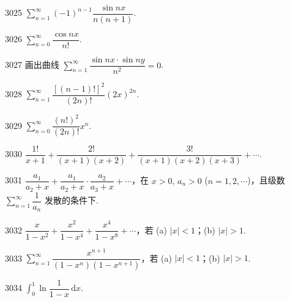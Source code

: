 \begin{prob}[S]{3025}
$\sum\limits_{n=1}^{\infty} (-1)^{n-1} \dfrac{\sin nx}{n(n+1)}$.
\end{prob}

\begin{prob}[S]{3026}
$\sum\limits_{n=0}^{\infty} \dfrac{\cos nx}{n!}$.
\end{prob}

\begin{prob}[M]{3027}
画出曲线 $\sum\limits_{n=1}^{\infty} \dfrac{\sin nx \cdot \sin ny}{n^2} = 0$.
\end{prob}


\begin{prob}[S]{3028}
$\sum\limits_{n=1}^{\infty} \dfrac{[(n-1)!]^2}{(2n)!} (2x)^{2n}$.
\end{prob}

\begin{prob}[S]{3029}
$\sum\limits_{n=0}^{\infty} \dfrac{(n!)^2}{(2n)!} x^n$.
\end{prob}

\begin{prob}[S]{3030}
$\dfrac{1!}{x+1} + \dfrac{2!}{(x+1)(x+2)} + \dfrac{3!}{(x+1)(x+2)(x+3)} + \cdots$.
\end{prob}

\begin{prob}[M]{3031}
$\dfrac{a_1}{a_2 + x} + \dfrac{a_1}{a_2 + x} \cdot \dfrac{a_2}{a_3 + x} + \cdots$，在 $x > 0, \, a_n > 0$ ($n = 1, 2, \cdots$)，且级数 $\sum\limits_{n=1}^{\infty} \dfrac{1}{a_n}$ 发散的条件下.
\end{prob}

\begin{prob}[M]{3032}
$\dfrac{x}{1-x^2} + \dfrac{x^2}{1-x^4} + \dfrac{x^4}{1-x^8} + \cdots$，若 (a) $|x| < 1$；(b) $|x| > 1$.
\end{prob}

\begin{prob}[M]{3033}
$\sum\limits_{n=1}^{\infty} \dfrac{x^{n+1}}{(1-x^n)(1-x^{n+1})}$，若 (a) $|x| < 1$；(b) $|x| > 1$.
\end{prob}



\begin{prob}[S]{3034}
$\int_0^1 \ln\dfrac{1}{1-x}\,\mathrm{d}x$.
\end{prob}

